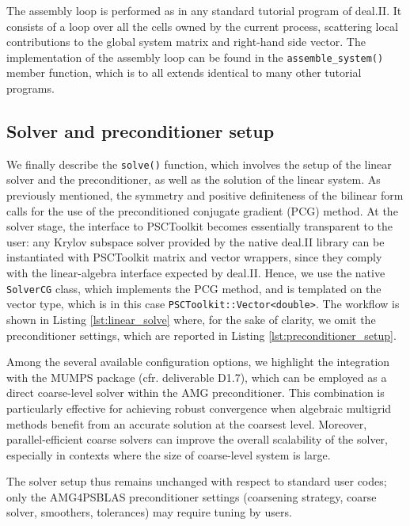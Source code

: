\documentclass[a4paper,12pt]{article}
\begin{document}
The assembly loop is performed as in any standard tutorial program of deal.II. It
consists of a loop over all the cells owned by the current process,
scattering local contributions to the global system matrix and
right-hand side vector. The implementation of the assembly loop 
can be found in the \texttt{assemble\_system()} member function, which
is to all extends identical to many other tutorial programs. 



\subsection{Solver and preconditioner setup}

We finally describe the \texttt{solve()} function, which involves the setup of the linear solver and the preconditioner, as well as the
solution of the linear system. As previously mentioned, the symmetry and positive definiteness of the bilinear form
calls for the use of the preconditioned conjugate gradient (PCG) method. At the solver stage, the interface to PSCToolkit becomes essentially
transparent to the user: any Krylov subspace solver provided by the native deal.II library can be instantiated
with PSCToolkit matrix and vector wrappers, since they comply with the linear-algebra interface expected by deal.II. Hence, we use the native
\texttt{SolverCG} class, which implements the PCG method, and is templated on the vector type, which is in this case \texttt{PSCToolkit::Vector<double>}. The workflow is shown in Listing \ref{lst:linear_solve} where, for the sake of clarity, we omit the preconditioner settings, which are reported
in Listing \ref{lst:preconditioner_setup}.

Among the several available configuration options, we highlight the
integration with the MUMPS package (cfr. deliverable D1.7), which can
be employed as a direct coarse-level solver within the AMG
preconditioner. This combination is particularly effective for
achieving robust convergence when algebraic multigrid methods benefit
from an accurate solution at the coarsest level. Moreover,
parallel-efficient coarse solvers can improve the overall scalability
of the solver, especially in contexts where the size of coarse-level
system is large. 


The solver setup thus remains unchanged with respect to standard user
codes; only the AMG4PSBLAS preconditioner settings (coarsening
strategy, coarse solver, smoothers, tolerances) may require tuning by
users. 
\newpage
\end{document}
